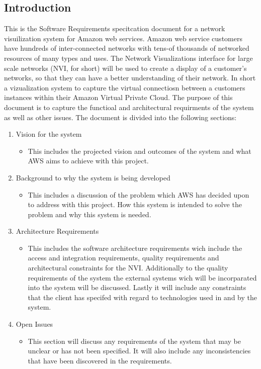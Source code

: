 \documentclass[a4paper,12pt]{report}
\begin{document}
\subsection{Introduction}
This is the Software Requirements specitcation document for a network visuilization system for Amazon web services. Amazon web service customers have hundreds of inter-connected networks with tens-of thousands of networked resources of many types and uses. The Network Visualizations interface for large scale networks (NVI, for short) will be used to create a display of a customer's networks, so that they can have a better understanding of their network. In short a vizualization system to capture the virtual connectiosn between a customers instances within their Amazon Virtual Private Cloud.
The purpose of this document is to capture the functioal and architectural requirments of the system as well as other issues. The document is divided into the following sections:
\begin{enumerate}
    \item Vision for the system
\begin{itemize}
    \item This includes the projected vision and outcomes of the system and what AWS aims to achieve with this project. 
\end{itemize}

    \item Background to why the system is being developed

\begin{itemize}
    \item This includes a discussion of the problem which AWS has decided upon to address with this project. How this system is intended to solve the problem and why this system is needed.
\end{itemize}

    \item Architecture Requirements
\setlength{\parindent}{2.5em}

\begin{itemize}
    \item This includes the software architecture requirements wich include the access and integration requirements, quality
requirements and architectural constraints for the NVI. Additionally to the quality requirements of the system the external systems wich will be incorparated into the system will be discussed. Lastly it will include any constraints that the client has
specifed with regard to technologies used in and by the system.
\end{itemize}

    \item Open Issues
\begin{itemize}
    \item This section will discuss any requirements of the system that may be unclear or has not been specified. It will also include any inconsistencies that have been discovered in the requirements. 
\end{itemize}
\end{enumerate}
\end{document}
